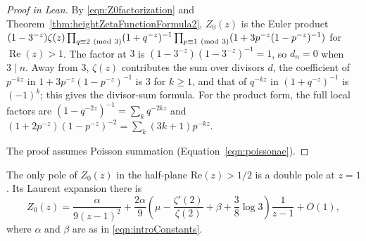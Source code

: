 \begin{proof}[Proof in Lean]

\leanok


By \eqref{eqn:Z0factorization} and Theorem~\ref{thm:heightZetaFunctionFormula2}, $Z_0(z)$ is the Euler product $(1-3^{-z})\zeta(z)\prod_{q\equiv2\ (\mathrm{mod}\ 3)}(1+q^{-z})^{-1}\prod_{p\equiv1\ (\mathrm{mod}\ 3)}(1+3p^{-z}(1-p^{-z})^{-1})$ for $\operatorname{Re}(z)>1$. The factor at $3$ is $(1-3^{-z})(1-3^{-z})^{-1}=1$, so $d_n=0$ when $3\mid n$. Away from $3$, $\zeta(z)$ contributes the sum over divisors $d$, the coefficient of $p^{-kz}$ in $1+3p^{-z}(1-p^{-z})^{-1}$ is $3$ for $k\geq1$, and that of $q^{-kz}$ in $(1+q^{-z})^{-1}$ is $(-1)^k$; this gives the divisor-sum formula. For the product form, the full local factors are $(1-q^{-2z})^{-1}=\sum_kq^{-2kz}$ and $(1+2p^{-z})(1-p^{-z})^{-2}=\sum_k(3k+1)p^{-kz}$.

The proof assumes Poisson summation (Equation~\ref{eqn:poissonae}).

\end{proof}

\begin{proposition}

\label{prop:leadingTerms}


\leanok



 The only pole of $Z_0(z)$ in the half-plane $\mathrm{Re}(z)>1/2$ is a double pole at $z=1$. Its Laurent expansion there is \begin{equation*} Z_0(z)=\frac{\alpha}{9(z-1)^2} +\frac{2\alpha}{9}\left(\mu-\frac{\zeta'(2)}{\zeta(2)}+\beta +\frac38\log3\right)\frac{1}{z-1}+O(1), \end{equation*} where $\alpha$ and $\beta$ are as in \eqref{eqn:introConstants}. 

\end{proposition}

